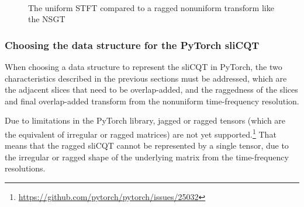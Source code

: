 \documentclass[report.tex]{subfiles}
\begin{document}
\begin{figure}[ht]
	\centering
	\\
	\caption{The uniform STFT compared to a ragged nonuniform transform like the NSGT}
	\label{fig:contraststftslicqt}
\end{figure}

\subsubsection{Choosing the data structure for the PyTorch sliCQT}
\label{sec:torchslicqdatastructure}

When choosing a data structure to represent the sliCQT in PyTorch, the two characteristics described in the previous sections must be addressed, which are the adjacent slices that need to be overlap-added, and the raggedness of the slices and final overlap-added transform from the nonuniform time-frequency resolution.

Due to limitations in the PyTorch library, jagged or ragged tensors (which are the equivalent of irregular or ragged matrices) are not yet supported.\footnote{\url{https://github.com/pytorch/pytorch/issues/25032}} That means that the ragged sliCQT cannot be represented by a single tensor, due to the irregular or ragged shape of the underlying matrix from the time-frequency resolutions.
\end{document}
